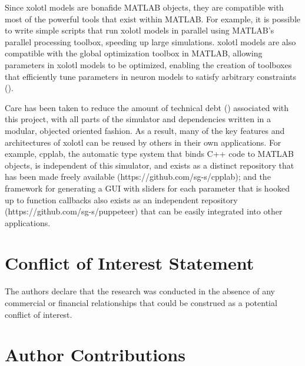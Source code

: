 \documentclass{frontiersSCNS} %
\begin{document}
Since xolotl models are bonafide MATLAB objects, they are compatible with most of the powerful tools that exist within MATLAB. For example, it is possible to write simple scripts that run xolotl models in parallel using MATLAB's parallel processing toolbox, speeding up large simulations. xolotl models are also compatible with the global optimization toolbox in MATLAB, allowing parameters in xolotl models to be optimized, enabling the creation of toolboxes that efficiently tune parameters in neuron models to satisfy arbitrary constraints (\cite{Achard:2006ia, Krichmar:2014jj, Keren:2005ja, VanGeit:2007ea, Druckmann:2008kg}).  

Care has been taken to reduce the amount of technical debt (\cite{suryanarayana2014refactoring}) associated with this project, with all parts of the simulator and dependencies written in a modular, objected oriented fashion. As a result, many of the key features and architectures of xolotl can be reused by others in their own applications. For example, cpplab, the automatic type system that binds C++ code to MATLAB objects, is independent of this simulator, and exists as a distinct repository that has been made freely available (https://github.com/sg-s/cpplab); and the framework for generating a GUI with sliders for each parameter that is hooked up to function callbacks also exists as an independent repository (https://github.com/sg-s/puppeteer) that can be easily integrated into other applications. 


%
%
%
%
%
%

\section*{Conflict of Interest Statement}

The authors declare that the research was conducted in the absence of any commercial or financial relationships that could be construed as a potential conflict of interest.

\section*{Author Contributions}
\end{document}
